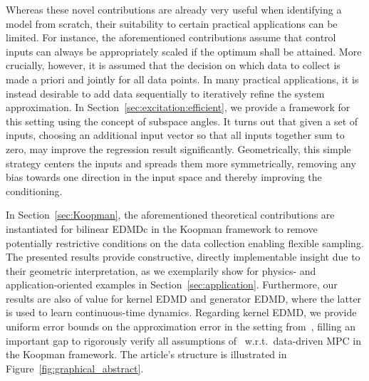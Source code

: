 \documentclass[a4paper, reqno]{amsart}
\begin{document}
Whereas these novel contributions are already very useful when identifying a model from scratch, their suitability to certain practical applications can be limited. 
For instance, the aforementioned contributions assume that control inputs can always be appropriately scaled if the optimum shall be attained. 
More crucially, however, it is assumed that the decision on which data to collect is made a priori and jointly for all data points. 
In many practical applications, it is instead desirable to add data sequentially to iteratively refine the system approximation. 
In Section~\ref{sec:excitation:efficient}, we provide a framework for this setting using the concept of subspace angles. 
It turns out that given a set of inputs, choosing an additional input vector so that all inputs together sum to zero, may improve the regression result significantly. Geometrically, this simple strategy centers the inputs and spreads them more symmetrically, removing any bias towards one direction in the input space and thereby improving the conditioning. %

In Section~\ref{sec:Koopman}, the aforementioned theoretical contributions are instantiated for bilinear EDMDc in the Koopman framework to remove potentially restrictive conditions on the data collection enabling flexible sampling. 
The presented results provide constructive, directly implementable insight due to their geometric interpretation, as we exemplarily show for physics- and application-oriented examples in Section~\ref{sec:application}. 
Furthermore, our results are also of value for kernel EDMD and generator EDMD, where the latter is used to learn continuous-time dynamics. 
Regarding kernel EDMD, we provide uniform error bounds on the approximation error in the setting from~\cite{BoldPhil24}, filling an important gap to rigorously verify all assumptions of~\cite{schimperna2025data} w.r.t.\ data-driven MPC in the Koopman framework. 
The article's structure is illustrated in Figure~\ref{fig:graphical_abstract}. 
\end{document}

